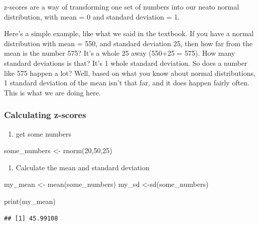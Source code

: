 \documentclass[
]{book}
\newenvironment{Shaded}{\begin{snugshade}}{\end{snugshade}}
\newcommand{\DecValTok}[1]{\textcolor[rgb]{0.00,0.00,0.81}{#1}}
\newcommand{\FunctionTok}[1]{\textcolor[rgb]{0.00,0.00,0.00}{#1}}
\newcommand{\NormalTok}[1]{#1}
\newcommand{\OtherTok}[1]{\textcolor[rgb]{0.56,0.35,0.01}{#1}}
\providecommand{\tightlist}{%
  \setlength{\itemsep}{0pt}\setlength{\parskip}{0pt}}
\begin{document}
z-scores are a way of transforming one set of numbers into our neato normal distribution, with mean = 0 and standard deviation = 1.

Here's a simple example, like what we said in the textbook. If you have a normal distribution with mean = 550, and standard deviation 25, then how far from the mean is the number 575? It's a whole 25 away (550+25 = 575). How many standard deviations is that? It's 1 whole standard deviation. So does a number like 575 happen a lot? Well, based on what you know about normal distributions, 1 standard deviation of the mean isn't that far, and it does happen fairly often. This is what we are doing here.

\hypertarget{calculating-z-scores}{%
\subsubsection{Calculating z-scores}\label{calculating-z-scores}}

\begin{enumerate}
\def\labelenumi{\arabic{enumi}.}
\tightlist
\item
  get some numbers
\end{enumerate}

\begin{Shaded}
\begin{Highlighting}[]
\NormalTok{some\_numbers }\OtherTok{\textless{}{-}} \FunctionTok{rnorm}\NormalTok{(}\DecValTok{20}\NormalTok{,}\DecValTok{50}\NormalTok{,}\DecValTok{25}\NormalTok{)}
\end{Highlighting}
\end{Shaded}

\begin{enumerate}
\def\labelenumi{\arabic{enumi}.}
\setcounter{enumi}{1}
\tightlist
\item
  Calculate the mean and standard deviation
\end{enumerate}

\begin{Shaded}
\begin{Highlighting}[]
\NormalTok{my\_mean }\OtherTok{\textless{}{-}} \FunctionTok{mean}\NormalTok{(some\_numbers)}
\NormalTok{my\_sd }\OtherTok{\textless{}{-}}\FunctionTok{sd}\NormalTok{(some\_numbers)}

\FunctionTok{print}\NormalTok{(my\_mean)}
\end{Highlighting}
\end{Shaded}

\begin{verbatim}
## [1] 45.99108
\end{verbatim}
\end{document}
